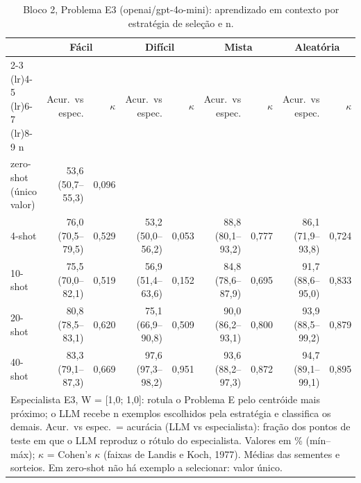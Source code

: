 \begin{table}[htbp]
\centering
\small
\caption{Bloco 2, Problema E3 (openai/gpt-4o-mini): aprendizado em contexto por estratégia de seleção e n.}
\label{tab:bloco2_E3_faseE_estrategia_x_nshot_gpt4mini}
\begin{tabular}{lrrrrrrrr}
\toprule
 & \multicolumn{2}{c}{Fácil} & \multicolumn{2}{c}{Difícil} & \multicolumn{2}{c}{Mista} & \multicolumn{2}{c}{Aleatória} \\ \cmidrule(lr){2-3} \cmidrule(lr){4-5} \cmidrule(lr){6-7} \cmidrule(lr){8-9}
n & Acur.\ vs espec. & $\kappa$ & Acur.\ vs espec. & $\kappa$ & Acur.\ vs espec. & $\kappa$ & Acur.\ vs espec. & $\kappa$ \\
\midrule
zero-shot (único valor) & 53,6 (50,7–55,3) & 0,096 &  &  &  &  &  &  \\
4-shot & 76,0 (70,5–79,5) & 0,529 & 53,2 (50,0–56,2) & 0,053 & 88,8 (80,1–93,2) & 0,777 & 86,1 (71,9–93,8) & 0,724 \\
10-shot & 75,5 (70,0–82,1) & 0,519 & 56,9 (51,4–63,6) & 0,152 & 84,8 (78,6–87,9) & 0,695 & 91,7 (88,6–95,0) & 0,833 \\
20-shot & 80,8 (78,5–83,1) & 0,620 & 75,1 (66,9–90,8) & 0,509 & 90,0 (86,2–93,1) & 0,800 & 93,9 (88,5–99,2) & 0,879 \\
40-shot & 83,3 (79,1–87,3) & 0,669 & 97,6 (97,3–98,2) & 0,951 & 93,6 (88,2–97,3) & 0,872 & 94,7 (89,1–99,1) & 0,895 \\
\bottomrule
\multicolumn{9}{p{0.95\linewidth}}{\footnotesize Especialista E3, W = [1,0; 1,0]: rotula o Problema E pelo centróide mais próximo; o LLM recebe n exemplos escolhidos pela estratégia e classifica os demais. Acur.\ vs espec.\ = acurácia (LLM vs especialista): fração dos pontos de teste em que o LLM reproduz o rótulo do especialista. Valores em \% (mín–máx); $\kappa$ = Cohen's $\kappa$ (faixas de Landis e Koch, 1977). Médias das sementes e sorteios. Em zero-shot não há exemplo a selecionar: valor único.} \\
\end{tabular}
\end{table}
